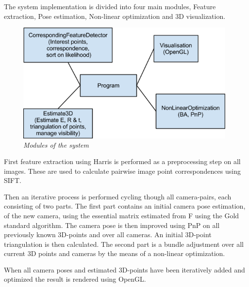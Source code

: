 The system implementation is divided into four main modules, Feature extraction, Pose estimation, Non-linear optimization and 3D visualization.

\begin{figure}[htb]
	\centering
	\includegraphics[width=110mm]{images/system_modules.png}
	\caption{\textit{Modules of the system}}
	\label{fig:block_overview2_fig}  %
\end{figure}

First feature extraction using Harris is performed as a preprocessing step on all images. These are used to calculate pairwise image point correspondences using SIFT.

Then an iterative process is performed cycling though all camera-pairs, each consisting of two parts. The first part contains an initial camera pose estimation, of the new camera, using the essential matrix estimated from F using the Gold standard algorithm. The camera pose is then improved using PnP on all previously known 3D-points and over all cameras. An initial 3D-point triangulation is then calculated.
The second part is a bundle adjustment over all current 3D points and cameras by the means of a non-linear optimization.

When all camera poses and estimated 3D-points have been iteratively added and optimized the result is rendered using OpenGL.